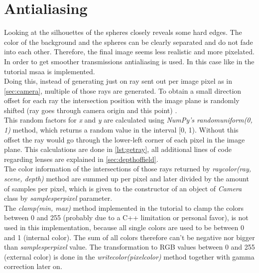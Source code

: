 \documentclass[]{article}
\begin{document}
	\section{Antialiasing}
	\label{sec:antialiasing}
	Looking at the silhouettes of the spheres closely reveals some hard edges. The color of the background and the spheres can be clearly separated and do not fade into each other. Therefore, the final image seems less realistic and more pixelated. In order to get smoother transmissions antialiasing is used. In this case like in the tutorial \ac{msaa} is implemented.
	\\
	Doing this, instead of generating just on ray sent out per image pixel as in \cref{sec:camera}, multiple of those rays are generated. To obtain a small direction offset for each ray the intersection position with the image plane is randomly shifted (ray goes through camera origin and this point) .
	\\
	This random factors for \emph{x} and \emph{y} are calculated using \emph{NumPy’s random\textunderscore uniform(0, 1)} method, which returns a random value in the interval [0, 1). Without this offset the ray would go through the lower-left corner of each pixel in the image plane. This calculations are done in \cref{lst:getray}, all additional lines of code regarding lenses are explained in \cref{sec:depthoffield}.
	\\
	The color information of the intersections of those rays returned by \emph{ray\textunderscore color(ray, scene, depth)} method are summed up per pixel and later divided by the amount of samples per pixel, which is given to the constructor of an object of \emph{Camera} class by \emph{samples\textunderscore per\textunderscore pixel} parameter. 
	\\
	The \emph{clamp(min, max)} method implemented in the tutorial to clamp the colors between 0 and 255 (probably due to a C++ limitation or personal favor), is not used in this implementation, because all single colors are used to be between 0 and 1 (internal color). The sum of all colors therefore can’t be negative nor bigger than \emph{samples\textunderscore per\textunderscore pixel} value. The transformation to RGB values between 0 and 255 (external color) is done in the \emph{write\textunderscore color(pixel\textunderscore color)} method together with gamma correction later on.
	
\end{document}
